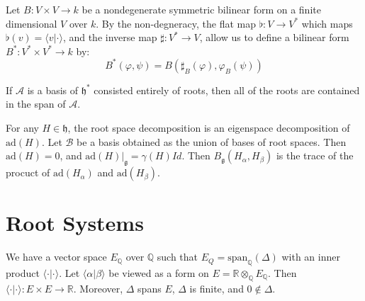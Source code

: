 \documentclass[crop=false,class=article]{standalone}                           %
\begin{document}
        Let $B:V\times{V}\rightarrow{k}$ be a nondegenerate symmetric bilinear
        form on a finite dimensional $V$ over $k$. By the non-degneracy, the
        flat map $\flat:V\rightarrow{V}^{*}$ which maps
        $\flat(v)=\langle{v}|\cdot\rangle$, and the inverse map
        $\sharp:V^{*}\rightarrow{V}$, allow us to define a bilinear form
        $B^{*}:V^{*}\times{V}^{*}\rightarrow{k}$ by:
        \begin{equation}
            B^{*}(\varphi,\psi)=B(\sharp_{B}(\varphi),\varphi_{B}(\psi))
        \end{equation}
        \begin{theorem}
            If $\mathcal{A}$ is a basis of $\mathfrak{h}^{*}$ consisted entirely
            of roots, then all of the roots are contained in the span of
            $\mathcal{A}$.
        \end{theorem}
        For any $H\in\mathfrak{h}$, the root space decomposition is an
        eigenspace decomposition of $\textrm{ad}(H)$. Let $\mathcal{B}$ be a
        basis obtained as the union of bases of root spaces. Then
        $\textrm{ad}(H)=0$, and $\textrm{ad}(H)|_{\mathfrak{g}}=\gamma(H)Id$.
        Then $B_{\mathfrak{g}}(H_{\alpha},H_{\beta})$ is the trace of the
        procuct of $\textrm{ad}(H_{\alpha})$ and $\textrm{ad}(H_{\beta})$.
    \section{Root Systems}
        We have a vector space $E_{\mathbb{Q}}$ over $\mathbb{Q}$ such that
        $E_{Q}=\textrm{span}_{\mathbb{Q}}(\Delta)$ with an inner product
        $\langle\cdot|\cdot\rangle$. Let $\langle\alpha|\beta\rangle$ be viewed
        as a form on $E=\mathbb{R}\otimes_{\mathbb{Q}}E_{\mathbb{Q}}$. Then
        $\langle\cdot|\cdot\rangle:E\times{E}\rightarrow\mathbb{R}$. Moreover,
        $\Delta$ spans $E$, $\Delta$ is finite, and $0\notin\Delta$.
\end{document}
